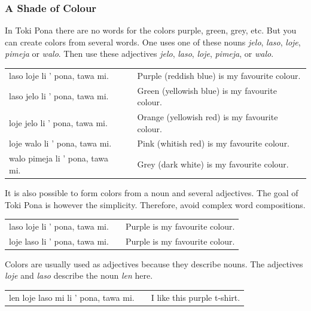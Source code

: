\subsubsection*{A Shade of Colour}
%
%
In Toki Pona there are no words for the colors purple, green, grey, etc.
But you can create colors from several words.
One uses one of these nouns \textit{jelo}, \textit{laso}, \textit{loje}, \textit{pimeja} or \textit{walo}.
Then use these adjectives \textit{jelo}, \textit{laso}, \textit{loje}, \textit{pimeja}, or \textit{walo}.

\begin{supertabular}{p{5,5cm}|ll}
    laso loje li ' pona, tawa mi.   &  & Purple (reddish blue) is my favourite colour.  \\
    laso jelo li ' pona, tawa mi.   &  & Green (yellowish blue) is my favourite colour. \\
    loje jelo li ' pona, tawa mi.   &  & Orange (yellowish red) is my favourite colour. \\
    loje walo li ' pona, tawa mi.   &  & Pink (whitish red) is my favourite colour.     \\
    walo pimeja li ' pona, tawa mi. &  & Grey (dark white) is my favourite colour.      \\
\end{supertabular}

It is also possible to form colors from a noun and several adjectives.
The goal of Toki Pona is however the simplicity.
Therefore, avoid complex word compositions.

\begin{supertabular}{p{5,5cm}|ll}
    laso loje  li ' pona, tawa mi. &  & Purple is my favourite colour. \\ %
    loje laso  li ' pona, tawa mi. &  & Purple is my favourite colour. \\
\end{supertabular}

Colors are usually used as adjectives because they describe nouns.
The adjectives \textit{loje} and \textit{laso} describe the noun \textit{len} here.

\begin{supertabular}{p{5,5cm}|ll}
    len loje laso mi li ' pona, tawa mi. &  & I like this purple t-shirt. \\
\end{supertabular}


